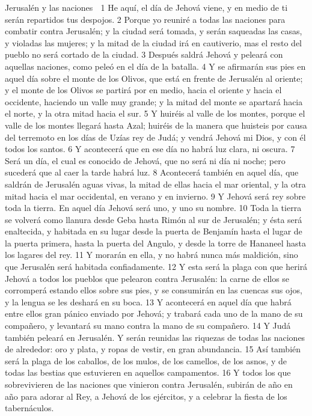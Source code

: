 Jerusalén y las naciones

1 He aquí, el día de Jehová viene, y en medio de ti serán repartidos tus despojos.
2 Porque yo reuniré a todas las naciones para combatir contra Jerusalén; y la ciudad será tomada, y serán saqueadas las casas, y violadas las mujeres; y la mitad de la ciudad irá en cautiverio, mas el resto del pueblo no será cortado de la ciudad.
3 Después saldrá Jehová y peleará con aquellas naciones, como peleó en el día de la batalla.
4 Y se afirmarán sus pies en aquel día sobre el monte de los Olivos, que está en frente de Jerusalén al oriente; y el monte de los Olivos se partirá por en medio, hacia el oriente y hacia el occidente, haciendo un valle muy grande; y la mitad del monte se apartará hacia el norte, y la otra mitad hacia el sur.
5 Y huiréis al valle de los montes, porque el valle de los montes llegará hasta Azal; huiréis de la manera que huisteis por causa del terremoto en los días de Uzías rey de Judá; y vendrá Jehová mi Dios, y con él todos los santos.
6 Y acontecerá que en ese día no habrá luz clara, ni oscura.
7 Será un día, el cual es conocido de Jehová, que no será ni día ni noche; pero sucederá que al caer la tarde habrá luz.
8 Acontecerá también en aquel día, que saldrán de Jerusalén aguas vivas, la mitad de ellas hacia el mar oriental, y la otra mitad hacia el mar occidental, en verano y en invierno.
9 Y Jehová será rey sobre toda la tierra. En aquel día Jehová será uno, y uno su nombre.
10 Toda la tierra se volverá como llanura desde Geba hasta Rimón al sur de Jerusalén; y ésta será enaltecida, y habitada en su lugar desde la puerta de Benjamín hasta el lugar de la puerta primera, hasta la puerta del Angulo, y desde la torre de Hananeel hasta los lagares del rey.
11 Y morarán en ella, y no habrá nunca más maldición, sino que Jerusalén será habitada confiadamente.
12 Y esta será la plaga con que herirá Jehová a todos los pueblos que pelearon contra Jerusalén: la carne de ellos se corromperá estando ellos sobre sus pies, y se consumirán en las cuencas sus ojos, y la lengua se les deshará en su boca.
13 Y acontecerá en aquel día que habrá entre ellos gran pánico enviado por Jehová; y trabará cada uno de la mano de su compañero, y levantará su mano contra la mano de su compañero.
14 Y Judá también peleará en Jerusalén. Y serán reunidas las riquezas de todas las naciones de alrededor: oro y plata, y ropas de vestir, en gran abundancia.
15 Así también será la plaga de los caballos, de los mulos, de los camellos, de los asnos, y de todas las bestias que estuvieren en aquellos campamentos.
16 Y todos los que sobrevivieren de las naciones que vinieron contra Jerusalén, subirán de año en año para adorar al Rey, a Jehová de los ejércitos, y a celebrar la fiesta de los tabernáculos. 
